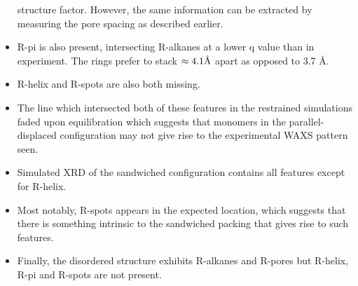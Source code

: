 \documentclass{article}
\newcommand{\angstrom}{\textup{\AA}}
\begin{document}
\begin{itemize}
	structure factor. However, the same information can be extracted by measuring 
	the pore spacing as described earlier.
	\item R-pi is also present, intersecting R-alkanes at a lower q value than
	in experiment. The rings prefer to stack $\approx 4.1 \angstrom$ apart as 
	opposed to 3.7 \angstrom.
	\item R-helix and R-spots are also both missing.
	\item The line which intersected both of these features in the restrained 
	simulations faded upon equilibration which suggests that monomers in the 
	parallel-displaced configuration may not give rise to the experimental WAXS 
	pattern seen.
	\item Simulated XRD of the sandwiched configuration contains all features 
	except for R-helix.
	\item Most notably, R-spots appears in the expected location, which suggests 
	that there is something intrinsic to the sandwiched packing that gives rise 
	to such features. 
	\item Finally, the disordered structure exhibits R-alkanes and R-pores but 
	R-helix, R-pi and R-spots are not present.
  \end{itemize}
  
\end{document}
